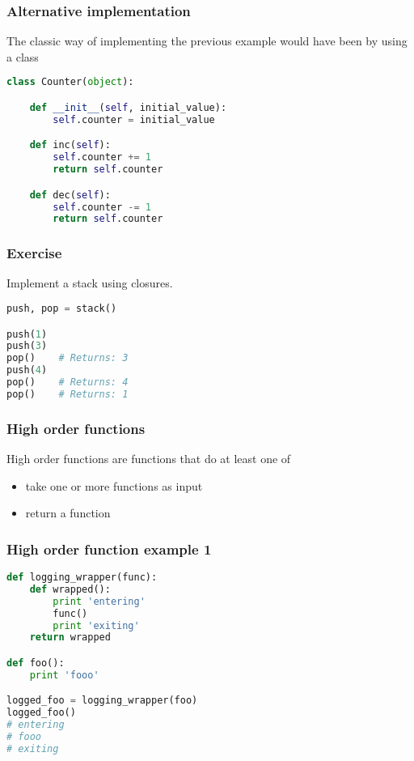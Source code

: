 \documentclass{beamer}
\begin{document}
\begin{frame}[fragile]
\frametitle{Alternative implementation}
The classic way of implementing the previous example
would have been by using a class

\vspace{5 mm}
\begin{lstlisting}[language=python]
class Counter(object):

    def __init__(self, initial_value):
        self.counter = initial_value

    def inc(self):
        self.counter += 1
        return self.counter

    def dec(self):
        self.counter -= 1
        return self.counter

\end{lstlisting}
\end{frame}

\begin{frame}[fragile]
\frametitle{Exercise}
Implement a stack using closures.
\vspace{5 mm}
\begin{lstlisting}[language=python]
push, pop = stack()

push(1)
push(3)
pop()    # Returns: 3
push(4)
pop()    # Returns: 4
pop()    # Returns: 1
\end{lstlisting}
\end{frame}

\begin{frame}[fragile]
\frametitle{High order functions}
High order functions are functions that do at least one of
\begin{itemize}
  \item take one or more functions as input
  \item return a function
\end{itemize}
\end{frame}

\begin{frame}[fragile]
\frametitle{High order function example 1}
\begin{lstlisting}[language=python]
def logging_wrapper(func):
    def wrapped():
        print 'entering'
        func()
        print 'exiting'
    return wrapped

def foo():
    print 'fooo'

logged_foo = logging_wrapper(foo)
logged_foo()
# entering
# fooo
# exiting
\end{lstlisting}
\end{frame}
\end{document}
